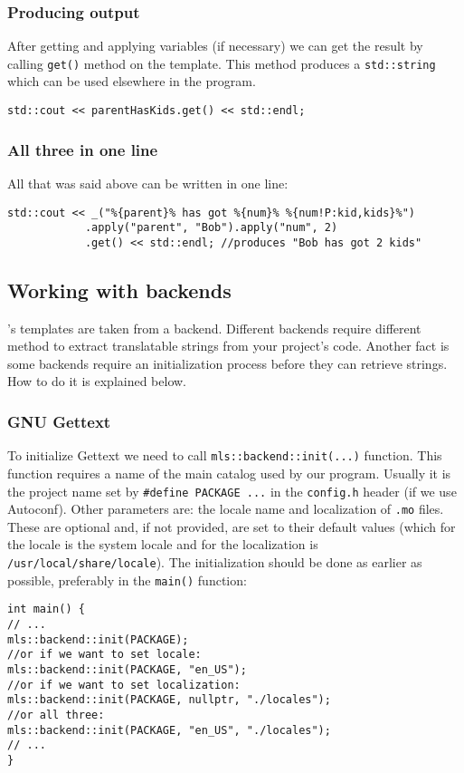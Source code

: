 \subsubsection{Producing output}
After getting and applying variables (if necessary) we can get the result by calling \verb+get()+ method on the template.
This method produces a \verb+std::string+ which can be used elsewhere in the program.
\begin{verbatim}
std::cout << parentHasKids.get() << std::endl;
\end{verbatim}

\subsubsection{All three in one line}
All that was said above can be written in one line:
\begin{verbatim}
std::cout << _("%{parent}% has got %{num}% %{num!P:kid,kids}%")
			.apply("parent", "Bob").apply("num", 2)
			.get() << std::endl; //produces "Bob has got 2 kids"
\end{verbatim}

\subsection{Working with backends}
\mulan{}'s templates are taken from a backend. Different backends require different method to extract translatable strings from your project's code.
Another fact is some backends require an initialization process before they can retrieve strings. How to do it is explained below.
\subsubsection{GNU Gettext}
To initialize Gettext we need to call \verb+mls::backend::init(...)+ function. 
This function requires a name of the main catalog used by our program. Usually it is the project name set by \verb+#define PACKAGE ...+ in the \texttt{config.h} header (if we use Autoconf).
Other parameters are: the locale name and localization of \texttt{.mo} files. These are optional and, if not provided, are set to their default values (which for the locale is the system locale 
and for the localization is \texttt{/usr/local/share/locale}). The initialization should be done as earlier as possible, preferably in the \verb+main()+ function:
\begin{verbatim}
int main() {
// ...
mls::backend::init(PACKAGE);
//or if we want to set locale:
mls::backend::init(PACKAGE, "en_US");
//or if we want to set localization:
mls::backend::init(PACKAGE, nullptr, "./locales");
//or all three:
mls::backend::init(PACKAGE, "en_US", "./locales");
// ...
}
\end{verbatim}

